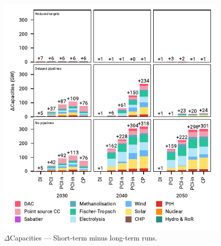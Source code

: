 \documentclass[preprint,12pt,sort&compress]{elsarticle}
\begin{document}
\begin{figure}[htbp]
  \centering
  \includegraphics{capacities_overview_extended.pdf}
  \caption{$\Delta$Capacities --- Short-term minus long-term runs.}
  \label{fig:capacities_overview_extended}
\end{figure}
\end{document}
